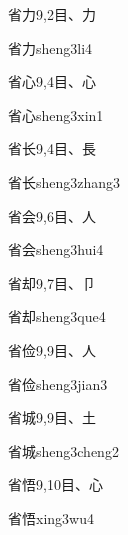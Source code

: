 \begin{Entry}{省力}{9,2}{⽬、⼒}
  \begin{Phonetics}{省力}{sheng3li4}
  \end{Phonetics}
\end{Entry}

\begin{Entry}{省心}{9,4}{⽬、⼼}
  \begin{Phonetics}{省心}{sheng3xin1}
  \end{Phonetics}
\end{Entry}

\begin{Entry}{省长}{9,4}{⽬、⾧}
  \begin{Phonetics}{省长}{sheng3zhang3}
  \end{Phonetics}
\end{Entry}

\begin{Entry}{省会}{9,6}{⽬、⼈}
  \begin{Phonetics}{省会}{sheng3hui4}
  \end{Phonetics}
\end{Entry}

\begin{Entry}{省却}{9,7}{⽬、⼙}
  \begin{Phonetics}{省却}{sheng3que4}
  \end{Phonetics}
\end{Entry}

\begin{Entry}{省俭}{9,9}{⽬、⼈}
  \begin{Phonetics}{省俭}{sheng3jian3}
  \end{Phonetics}
\end{Entry}

\begin{Entry}{省城}{9,9}{⽬、⼟}
  \begin{Phonetics}{省城}{sheng3cheng2}
  \end{Phonetics}
\end{Entry}

\begin{Entry}{省悟}{9,10}{⽬、⼼}
  \begin{Phonetics}{省悟}{xing3wu4}
  \end{Phonetics}
\end{Entry}

